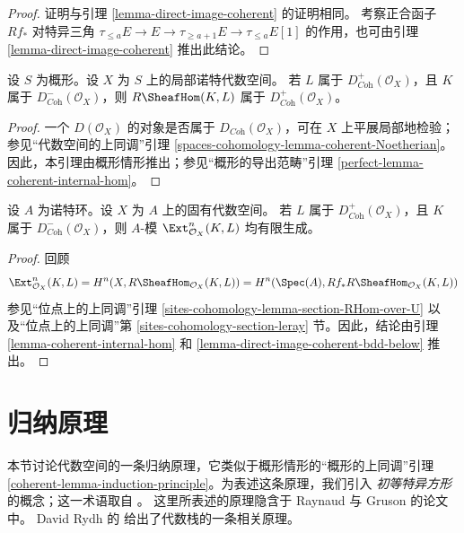 \begin{proof}
证明与引理 \ref{lemma-direct-image-coherent} 的证明相同。
考察正合函子 $Rf_*$ 对特异三角
$\tau_{\leq a}E \to E \to \tau_{\geq a + 1}E \to \tau_{\leq a}E[1]$
的作用，也可由引理 \ref{lemma-direct-image-coherent} 推出此结论。
\end{proof}

\begin{lemma}
\label{lemma-coherent-internal-hom}
设 $S$ 为概形。设 $X$ 为 $S$ 上的局部诺特代数空间。
若 $L$ 属于 $D^+_{\textit{Coh}}(\mathcal{O}_X)$，且
$K$ 属于 $D^-_{\textit{Coh}}(\mathcal{O}_X)$，则
$R\SheafHom(K, L)$ 属于 $D^+_{\textit{Coh}}(\mathcal{O}_X)$。
\end{lemma}

\begin{proof}
一个 $D(\mathcal{O}_X)$ 的对象是否属于
$D_{\textit{Coh}}(\mathcal{O}_X)$，可在 $X$ 上平展局部地检验；
参见“代数空间的上同调”引理
\ref{spaces-cohomology-lemma-coherent-Noetherian}。
因此，本引理由概形情形推出；参见“概形的导出范畴”引理
\ref{perfect-lemma-coherent-internal-hom}。
\end{proof}

\begin{lemma}
\label{lemma-ext-finite}
设 $A$ 为诺特环。设 $X$ 为 $A$ 上的固有代数空间。
若 $L$ 属于 $D^+_{\textit{Coh}}(\mathcal{O}_X)$，且 $K$ 属于
$D^-_{\textit{Coh}}(\mathcal{O}_X)$，则 $A$-模
$\Ext_{\mathcal{O}_X}^n(K, L)$ 均有限生成。
\end{lemma}

\begin{proof}
回顾
$$
\Ext_{\mathcal{O}_X}^n(K, L) =
H^n(X, R\SheafHom_{\mathcal{O}_X}(K, L)) =
H^n(\Spec(A), Rf_*R\SheafHom_{\mathcal{O}_X}(K, L))
$$
参见“位点上的上同调”引理
\ref{sites-cohomology-lemma-section-RHom-over-U} 以及“位点上的上同调”第
\ref{sites-cohomology-section-leray} 节。因此，结论由引理
\ref{lemma-coherent-internal-hom} 和
\ref{lemma-direct-image-coherent-bdd-below} 推出。
\end{proof}

\section{归纳原理}
\label{section-induction}

\noindent
本节讨论代数空间的一条归纳原理，它类似于概形情形的“概形的上同调”引理
\ref{coherent-lemma-induction-principle}。为表述这条原理，我们引入
{\it 初等特异方形}的概念；这一术语取自 \cite{MV}。
这里所表述的原理隐含于 Raynaud 与 Gruson 的论文 \cite{GruRay} 中。
David Rydh 的 \cite[Theorem D]{rydh_etale_devissage}
给出了代数栈的一条相关原理。

